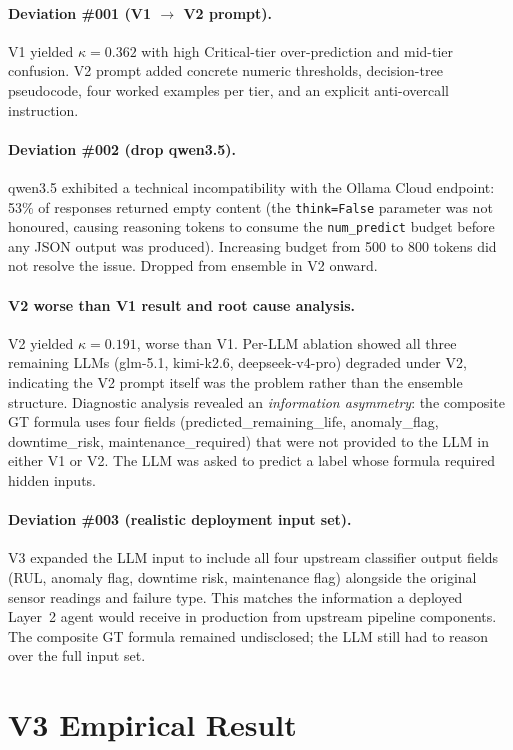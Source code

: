 \paragraph{Deviation \#001 (V1 $\to$ V2 prompt).} V1 yielded $\kappa = 0.362$ with high Critical-tier over-prediction and mid-tier confusion. V2 prompt added concrete numeric thresholds, decision-tree pseudocode, four worked examples per tier, and an explicit anti-overcall instruction.

\paragraph{Deviation \#002 (drop qwen3.5).} qwen3.5 exhibited a technical incompatibility with the Ollama Cloud endpoint: 53\% of responses returned empty content (the \texttt{think=False} parameter was not honoured, causing reasoning tokens to consume the \texttt{num\_predict} budget before any JSON output was produced). Increasing budget from 500 to 800 tokens did not resolve the issue. Dropped from ensemble in V2 onward.

\paragraph{V2 worse than V1 result and root cause analysis.} V2 yielded $\kappa = 0.191$, worse than V1. Per-LLM ablation showed all three remaining LLMs (glm-5.1, kimi-k2.6, deepseek-v4-pro) degraded under V2, indicating the V2 prompt itself was the problem rather than the ensemble structure. Diagnostic analysis revealed an \emph{information asymmetry}: the composite GT formula uses four fields (predicted\_remaining\_life, anomaly\_flag, downtime\_risk, maintenance\_required) that were not provided to the LLM in either V1 or V2. The LLM was asked to predict a label whose formula required hidden inputs.

\paragraph{Deviation \#003 (realistic deployment input set).} V3 expanded the LLM input to include all four upstream classifier output fields (RUL, anomaly flag, downtime risk, maintenance flag) alongside the original sensor readings and failure type. This matches the information a deployed Layer~2 agent would receive in production from upstream pipeline components. The composite GT formula remained undisclosed; the LLM still had to reason over the full input set.

\section{V3 Empirical Result}

